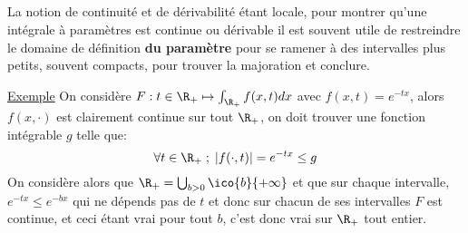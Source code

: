 \subsection*{}
La notion de continuité et de dérivabilité étant locale, pour montrer qu'une intégrale à paramètres est continue ou dérivable il est souvent utile de restreindre le domaine de définition \textbf{du paramètre} pour se ramener à des intervalles plus petits, souvent compacts, pour trouver la majoration et conclure.\<

\uline{Exemple} On considère \(F : t \in \R_+ \mapsto \int_{\R_+} f(x, t)dx\) avec \(f(x, t) = e^{-tx}\), alors \(f(x, \cdot)\) est clairement continue sur tout \(\R_+\), on doit trouver une fonction intégrable \(g\) telle que:
\[
   \forall t \in \R_+ \; ; \; |f(\cdot, t)| = e^{-tx} \leq g
\]
On considère alors que \(\R_+ = \bigcup_{b > 0} \ico{b}{+\infty}\) et que sur chaque intervalle, \(e^{-tx} \leq e^{-bx}\) qui ne dépends pas de \(t\) et donc sur chacun de ses intervalles \(F\) est continue, et ceci étant vrai pour tout \(b\), c'est donc vrai sur \(\R_+\) tout entier.

